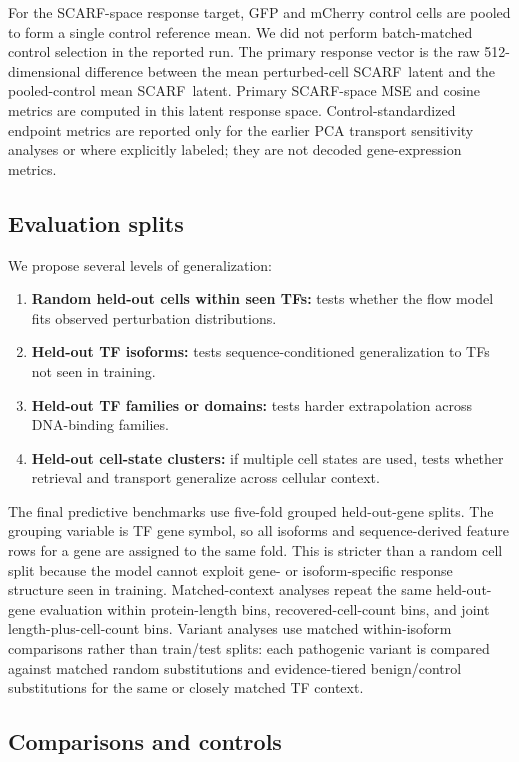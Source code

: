 \documentclass[11pt]{article}
\newcommand{\scarf}{\textsc{SCARF}}
\begin{document}
For the \scarf-space response target, GFP and mCherry control cells are pooled to form a single control reference mean. We did not perform batch-matched control selection in the reported run. The primary response vector is the raw 512-dimensional difference between the mean perturbed-cell \scarf\ latent and the pooled-control mean \scarf\ latent. Primary \scarf-space MSE and cosine metrics are computed in this latent response space. Control-standardized endpoint metrics are reported only for the earlier PCA transport sensitivity analyses or where explicitly labeled; they are not decoded gene-expression metrics.

\subsection{Evaluation splits}

We propose several levels of generalization:
\begin{enumerate}
    \item \textbf{Random held-out cells within seen TFs:} tests whether the flow model fits observed perturbation distributions.
    \item \textbf{Held-out TF isoforms:} tests sequence-conditioned generalization to TFs not seen in training.
    \item \textbf{Held-out TF families or domains:} tests harder extrapolation across DNA-binding families.
    \item \textbf{Held-out cell-state clusters:} if multiple cell states are used, tests whether retrieval and transport generalize across cellular context.
\end{enumerate}

The final predictive benchmarks use five-fold grouped held-out-gene splits. The grouping variable is TF gene symbol, so all isoforms and sequence-derived feature rows for a gene are assigned to the same fold. This is stricter than a random cell split because the model cannot exploit gene- or isoform-specific response structure seen in training. Matched-context analyses repeat the same held-out-gene evaluation within protein-length bins, recovered-cell-count bins, and joint length-plus-cell-count bins. Variant analyses use matched within-isoform comparisons rather than train/test splits: each pathogenic variant is compared against matched random substitutions and evidence-tiered benign/control substitutions for the same or closely matched TF context.

\subsection{Comparisons and controls}
\end{document}
